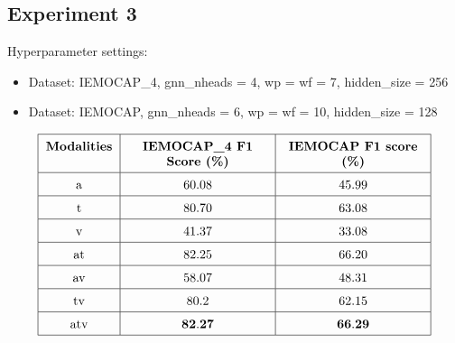 \documentclass[a4paper]{article}
\begin{document}
\subsection{Experiment 3}
Hyperparameter settings: 

\begin{itemize}
    \item Dataset: IEMOCAP\_4, gnn\_nheads = 4, wp = wf = 7, hidden\_size = 256
    \item Dataset: IEMOCAP, gnn\_nheads = 6, wp = wf = 10, hidden\_size = 128
\end{itemize}

\[
\renewcommand{\arraystretch}{1.5}
\begin{tabular}{|c|p{3.9cm}<{\centering}|p{3.9cm}<{\centering}|}
    \hline
    \textbf{Modalities} & \textbf{IEMOCAP\_4 F1 Score (\%)} & \textbf{IEMOCAP F1 score (\%)} \\
    \hline
    \text{a} & 60.08 & 45.99 \\
    \hline
    \text{t} & 80.70 & 63.08 \\
    \hline
    \text{v} & 41.37 & 33.08 \\
    \hline
    \text{at} & 82.25 & 66.20 \\
    \hline
    \text{av} & 58.07 & 48.31 \\
    \hline
    \text{tv} & 80.2 & 62.15 \\
    \hline
    \text{atv} & \(\mathbf{82.27}\) & \(\mathbf{66.29}\) \\
    \hline
\end{tabular}
\]
\end{document}
